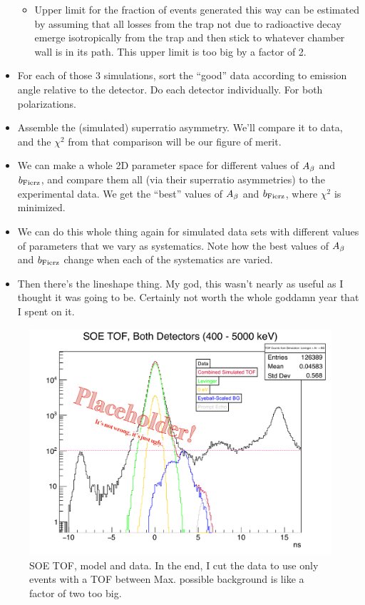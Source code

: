\begin{itemize}
\begin{itemize}
		\item Upper limit for the fraction of events generated this way can be estimated by assuming that all losses from the trap not due to radioactive decay emerge isotropically from the trap and then stick to whatever chamber wall is in its path.  This upper limit is too big by a factor of 2.
		\end{itemize}
	\item For each of those 3 simulations, sort the ``good'' data according to emission angle relative to the detector.  Do each detector individually.  For both polarizations.
	\item Assemble the (simulated) superratio asymmetry.  We'll compare it to data, and the $\chi^2$ from that comparison will be our figure of merit.  
	\item We can make a whole 2D parameter space for different values of $A_{\beta}$ and $b_{\mathrm{Fierz}}$, and compare them all (via their superratio asymmetries) to the experimental data.  We get the ``best'' values of $A_{\beta}$ and $b_{\mathrm{Fierz}}$, where $\chi^2$ is minimized.
	\item We can do this whole thing again for simulated data sets with different values of parameters that we vary as systematics.  Note how the best values of $A_{\beta}$ and $b_{\mathrm{Fierz}}$ change when each of the systematics are varied.
	\item Then there's the lineshape thing.  My god, this wasn't nearly as useful as I thought it was going to be.  Certainly not worth the whole goddamn year that I spent on it.
\end{itemize}


\begin{figure}[t!h]
	\centering
	\includegraphics[width=.999\linewidth]
	{Figures/SOETOF_withmodel.pdf}
	\caption{SOE TOF, model and data.  In the end, I cut the data to use only events with a TOF between   Max. possible background is like a factor of two too big.}	
	\label{fig:soetof}
\end{figure}



